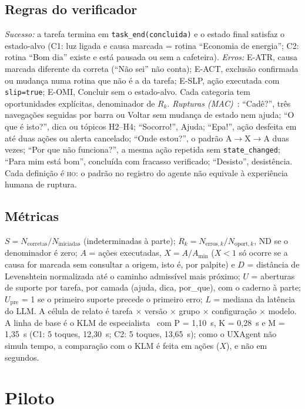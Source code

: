\documentclass[conference]{IEEEtran}
\newcommand{\stHO}{\textsc{ho}}
\newcommand{\ev}[1]{\texttt{#1}}
\begin{document}
\subsection{Regras do verificador}
\textit{Sucesso:} a tarefa termina em \ev{task\_end(concluida)} e o estado final satisfaz o estado-alvo (C1: luz ligada e causa marcada = rotina ``Economia de energia''; C2: rotina ``Bom dia'' existe e está pausada ou sem a cafeteira). \textit{Erros:} E-ATR, causa marcada diferente da correta (``Não sei'' não conta); E-ACT, exclusão confirmada ou mudança numa rotina que não é a da tarefa; E-SLP, ação executada com \texttt{slip=true}; E-OMI, Concluir sem o estado-alvo. Cada categoria tem oportunidades explícitas, denominador de $R_k$. \textit{Rupturas (MAC)}~\cite{prates2000}: ``Cadê?'', três navegações seguidas por barra ou Voltar sem mudança de estado nem ajuda; ``O que é isto?'', dica ou tópicos H2--H4; ``Socorro!'', Ajuda; ``Epa!'', ação desfeita em até duas ações ou alerta cancelado; ``Onde estou?'', o padrão A$\rightarrow$X$\rightarrow$A duas vezes; ``Por que não funciona?'', a mesma ação repetida sem \ev{state\_changed}; ``Para mim está bom'', concluída com fracasso verificado; ``Desisto'', desistência. Cada definição é \stHO: o padrão no registro do agente não equivale à experiência humana de ruptura.

\subsection{Métricas}
$S = N_{\mathrm{corretas}}/N_{\mathrm{iniciadas}}$ (indeterminadas à parte); $R_k = N_{\mathrm{erros},k}/N_{\mathrm{oport},k}$, ND se o denominador é zero; $A$ = ações executadas, $X = A/A_{\min}$ ($X<1$ só ocorre se a causa for marcada sem consultar a origem, isto é, por palpite) e $D$ = distância de Levenshtein normalizada até o caminho admissível mais próximo; $U$ = aberturas de suporte por tarefa, por camada (ajuda, dica, por\_que), com o caderno à parte; $U_{\mathrm{pre}}$ = 1 se o primeiro suporte precede o primeiro erro; $L$ = mediana da latência do LLM. A célula de relato é tarefa $\times$ versão $\times$ grupo $\times$ configuração $\times$ modelo. A linha de base é o KLM de especialista~\cite{card1980} com P = 1,10~s, K = 0,28~s e M = 1,35~s (C1: 5 toques, 12,30~s; C2: 5 toques, 13,65~s); como o UXAgent não simula tempo, a comparação com o KLM é feita em ações ($X$), e não em segundos.

\section{Piloto}\label{sec:piloto}
\end{document}
